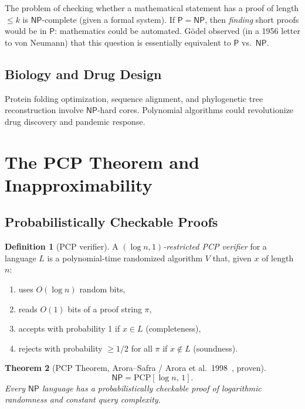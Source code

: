 \documentclass[12pt,a4paper]{amsart}
\newtheorem{theorem}{Theorem}[section]
\theoremstyle{definition}
\newtheorem{definition}[theorem]{Definition}
\newcommand{\Pclass}{\mathsf{P}}
\newcommand{\NP}{\mathsf{NP}}
\begin{document}
The problem of checking whether a mathematical statement has a proof of length
$\leq k$ is $\NP$-complete (given a formal system).  If $\Pclass=\NP$, then
\emph{finding} short proofs would be in $\Pclass$: mathematics could be
automated.  Gödel observed (in a 1956 letter to von Neumann) that this question
is essentially equivalent to $\Pclass$ vs.\ $\NP$.

\subsection{Biology and Drug Design}

Protein folding optimization, sequence alignment, and phylogenetic tree
reconstruction involve $\NP$-hard cores.  Polynomial algorithms could
revolutionize drug discovery and pandemic response.

\section{The PCP Theorem and Inapproximability}
\label{sec:pcp}

\subsection{Probabilistically Checkable Proofs}

\begin{definition}[PCP verifier]
A \emph{$(\log n, 1)$-restricted PCP verifier} for a language $L$ is a
polynomial-time randomized algorithm $V$ that, given $x$ of length $n$:
\begin{enumerate}[label=(\roman*)]
  \item uses $O(\log n)$ random bits,
  \item reads $O(1)$ bits of a proof string $\pi$,
  \item accepts with probability 1 if $x\in L$ (completeness),
  \item rejects with probability $\geq 1/2$ for all $\pi$ if $x\notin L$ (soundness).
\end{enumerate}
\end{definition}

\begin{theorem}[PCP Theorem, Arora--Safra / Arora et al.\ 1998~\cite{arora1998}, proven]
\[
  \NP = \mathrm{PCP}[\log n,\, 1].
\]
Every $\NP$ language has a probabilistically checkable proof of logarithmic
randomness and constant query complexity.
\end{theorem}
\end{document}
